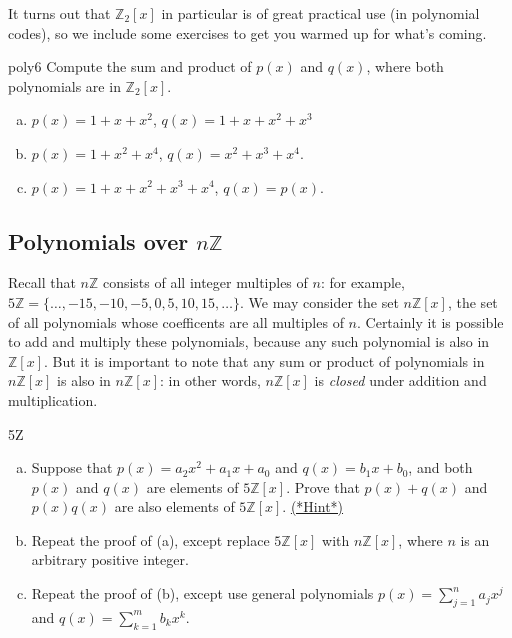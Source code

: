 It turns out that $\mathbb{Z}_2[x]$ in particular is of great practical use (in polynomial codes), so we include some exercises to get you warmed up for what's coming.

\begin{exercise}{poly6}
Compute the sum and product of $p(x)$ and $q(x)$, where both polynomials are in $\mathbb{Z}_2[x]$.
\begin{enumerate}[(a)]
\item
$p(x)=  1+ x +x^2$, $q(x)= 1+x+x^2+x^3$
\item
$p(x)= 1 + x^2+x^4$, $q(x)=x^2+x^3+x^4 $.
\item
$p(x)= 1 +x+x^2+x^3+x^4 $, $q(x)=p(x)$.
\end{enumerate}
\end{exercise}

\subsection*{Polynomials over $n\mathbb{Z}$}
Recall that $n\mathbb{Z}$ consists of all integer multiples of $n$: for example, $5\mathbb{Z} = \{\ldots, -15,-10,-5,0,5,10,15,\ldots\}$.  
We may consider the set $n\mathbb{Z}[x]$, the set of all polynomials whose coefficents are all multiples of $n$.  Certainly it is possible to add and multiply 
these polynomials, because any such polynomial is also in $\mathbb{Z}[x]$.  But it is important to note that any sum or product of polynomials in 
$n\mathbb{Z}[x]$ is also in $n\mathbb{Z}[x]$: in other words, $n\mathbb{Z}[x]$ is \emph{closed} under addition and multiplication.


\begin{exercise}{5Z}
\begin{enumerate}[(a)]
\item
Suppose that $p(x) = a_2 x^2 + a_1 x + a_0$ and $q(x) = b_1 x + b_0$, and both $p(x)$ and $q(x)$ are elements of $5\mathbb{Z}[x]$. Prove that 
$p(x) + q(x)$ and $p(x)  q(x)$ are also elements of $5\mathbb{Z}[x]$. \hyperref[sec:Polynomials:Hints]{(*Hint*)} 

\item
Repeat the proof of (a), except replace $5\mathbb{Z}[x]$ with $n\mathbb{Z}[x]$, where $n$ is an arbitrary positive integer.

\item
Repeat the proof of (b), except use general polynomials $p(x) = \sum_{j=1}^n a_jx^j$ and $q(x) = \sum_{k=1}^m b_k x^k$.
\end{enumerate}
\end{exercise}

